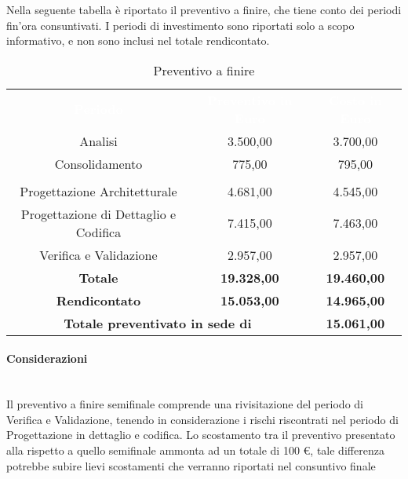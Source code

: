 Nella seguente tabella è riportato il preventivo a finire, che tiene conto dei periodi fin'ora consuntivati. I periodi di investimento sono riportati solo a scopo informativo, e non sono inclusi nel totale rendicontato.

\begin{table}[H]
	\centering
	\begin{tabular}{ccc}
	\rowcolor{greySWEight}
	\textcolor{white}{\textbf{Periodo}} &
	\textcolor{white}{\textbf{Preventivo in Euro}} & 
	\textcolor{white}{\textbf{Costo in Euro}} \\
	Analisi & 3.500,00 & 3.700,00 \\
	Consolidamento & 775,00 & 795,00 \\
	\rowcolor{greySWEight}
	\multicolumn{3}{c}{ \textcolor{white}{\textbf{Rendicontato}} } \\
	Progettazione Architetturale & 4.681,00 & 4.545,00 \\
	Progettazione di Dettaglio e Codifica & 7.415,00 & 7.463,00 \\
	Verifica e Validazione & 2.957,00 & 2.957,00 \\
	\textbf{Totale} & \textbf{19.328,00} & \textbf{19.460,00} \\
	\textbf{Rendicontato} & \textbf{15.053,00} & \textbf{14.965,00} \\
	\multicolumn{2}{c}{\textbf{Totale preventivato in sede di \RR{}} } & \textbf{15.061,00} \\
	\end{tabular}
	\caption{Preventivo a finire}
\end{table}
\paragraph{Considerazioni}\mbox{}\\
Il preventivo a finire semifinale comprende una rivisitazione del periodo di Verifica e Validazione, tenendo in considerazione i rischi riscontrati nel periodo di Progettazione in dettaglio e codifica. Lo scostamento tra il preventivo presentato alla \RR{} rispetto a quello semifinale ammonta ad un totale di 100 \euro, tale differenza potrebbe subire lievi scostamenti che verranno riportati nel consuntivo finale